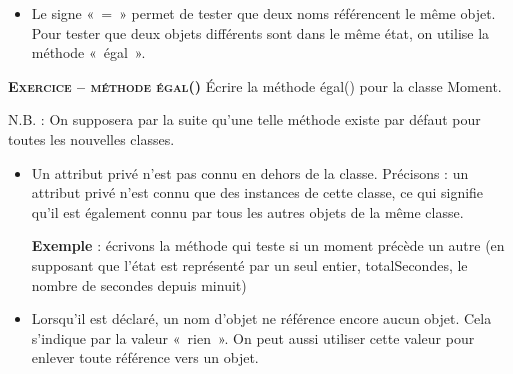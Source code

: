 \begin{itemize}
\bigskip

\item {
Le signe «~=~» permet de tester que deux noms référencent le même objet.
Pour tester que deux objets différents sont dans le même état, on
utilise la méthode «~égal~».}
\\
\bigskip
{}
\end{itemize}
\bigskip

{\sffamily\bfseries\scshape
Exercice – méthode égal()}
{
Écrire la méthode égal() pour la classe Moment.}

\bigskip

{
N.B. : On supposera par la suite qu'une telle méthode
existe par défaut pour toutes les nouvelles classes.}

\liststyleListv
\begin{itemize}
	\item {
	Un attribut privé n'est pas connu en dehors de la
	classe. Précisons : un attribut privé n'est connu que
	des instances de cette classe, ce qui signifie qu'il
	est également connu par tous les autres objets de la même
	classe.

	\textbf{Exemple} : écrivons la méthode qui teste si un moment précède un
	autre (en supposant que l'état est représenté par un
	seul entier, totalSecondes, le nombre de secondes depuis minuit)
	\\
	\bigskip
	\bigskip
	}
	\item {
	Lorsqu'il est déclaré, un nom d'objet
	ne référence encore aucun objet. Cela s'indique par la
	valeur «~rien~». On peut aussi utiliser cette valeur pour enlever toute
	référence vers un objet.
	\\
	\bigskip
	}
\end{itemize}
	
